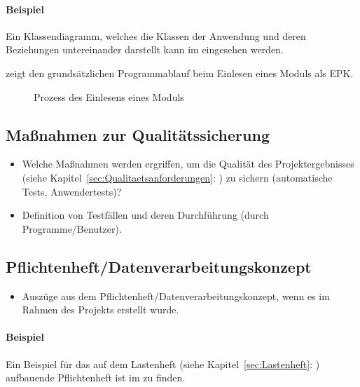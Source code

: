 \paragraph{Beispiel}
Ein Klassendiagramm, welches die Klassen der Anwendung und deren Beziehungen untereinander darstellt kann im  eingesehen werden.

 zeigt den grundsätzlichen Programmablauf beim Einlesen eines Moduls als EPK.
\begin{figure}[htb]
\centering
{}
\caption{Prozess des Einlesens eines Moduls}
\label{fig:Modulimport}
\end{figure}


\subsection{Maßnahmen zur Qualitätssicherung}
\label{sec:Qualitaetssicherung}
\begin{itemize}
	\item Welche Maßnahmen werden ergriffen, um die Qualität des Projektergebnisses (siehe Kapitel~\ref{sec:Qualitaetsanforderungen}: ) zu sichern (\zB automatische Tests, Anwendertests)?
	\item \Ggfs Definition von Testfällen und deren Durchführung (durch Programme/Benutzer).
\end{itemize}


\subsection{Pflichtenheft/Datenverarbeitungskonzept}
\label{sec:Pflichtenheft}
\begin{itemize}
	\item Auszüge aus dem Pflichtenheft/Datenverarbeitungskonzept, wenn es im Rahmen des Projekts erstellt wurde.
\end{itemize}

\paragraph{Beispiel}
Ein Beispiel für das auf dem Lastenheft (siehe Kapitel~\ref{sec:Lastenheft}: ) aufbauende Pflichtenheft ist im  zu finden.
